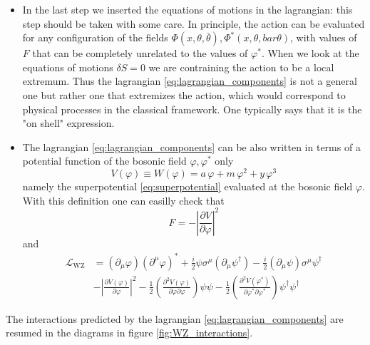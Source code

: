 \documentclass[12pt]{article}
\begin{document}
\begin{itemize}
  \item In the last step we inserted the equations of motions in the lagrangian: this step should be taken with some care. In principle, the action can be evaluated for any configuration of the fields $\Phi(x, \theta, \bar\theta), \Phi^*(x,\theta, bar\theta)$, with values of $F$ that can be completely unrelated to the values of $\varphi^*$. 
  When we look at the equations of motions $\delta S = 0$ we are contraining the action to be a local extremum. Thus the lagrangian \ref{eq:lagrangian_components} is not a general one but rather one that extremizes the action, which would correspond to physical processes in the classical framework. One typically says that it is the "on shell" expression.
  \item The lagrangian \ref{eq:lagrangian_components} can be also written in terms of a potential function of the bosonic field $\varphi, \varphi^*$ only
  \begin{equation*}
    V(\varphi) \equiv W(\varphi) = a \, \varphi + m \, \varphi^2 + y \, \varphi^3
  \end{equation*}
  namely the superpotential \ref{eq:superpotential} evaluated at the bosonic field $\varphi$. With this definition one can easilly check that
  \begin{equation*}
    F = -\left|\frac{\partial V}{\partial \varphi}\right|^2
  \end{equation*}
  and 
  \begin{equation*}
    \begin{aligned}
        \mathcal{L}_{\mathrm{WZ}} &=\left(\partial_{\mu} \varphi\right)\left(\partial^{\mu} \varphi\right)^{*}+\frac{i}{2} \psi \sigma^{\mu}\left(\partial_{\mu} \psi^{\dagger}\right)-\frac{i}{2}\left(\partial_{\mu} \psi\right) \sigma^{\mu} \psi^{\dagger} \\
        &-\left|\frac{\partial V\left(\varphi\right)}{\partial \varphi}\right|^{2}-\frac{1}{2}\left(\frac{\partial^{2} V\left(\varphi\right)}{\partial \varphi \partial \varphi}\right) \psi \psi-\frac{1}{2}\left(\frac{\partial^{2} V\left(\varphi^*\right)}{\partial \varphi^{*} \partial \varphi^{*}}\right) \psi^{\dagger} \psi^{\dagger}
    \end{aligned}
\end{equation*}
\end{itemize}
The interactions predicted by the lagrangian \ref{eq:lagrangian_components} are resumed in the diagrams in figure \ref{fig:WZ_interactions}.
\end{document}
